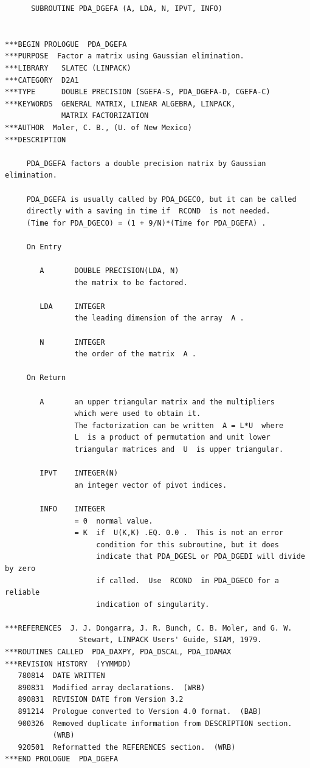 \documentclass[11pt,twoside]{article}
\begin{document}
\begin{verbatim}
      SUBROUTINE PDA_DGEFA (A, LDA, N, IPVT, INFO)


***BEGIN PROLOGUE  PDA_DGEFA
***PURPOSE  Factor a matrix using Gaussian elimination.
***LIBRARY   SLATEC (LINPACK)
***CATEGORY  D2A1
***TYPE      DOUBLE PRECISION (SGEFA-S, PDA_DGEFA-D, CGEFA-C)
***KEYWORDS  GENERAL MATRIX, LINEAR ALGEBRA, LINPACK,
             MATRIX FACTORIZATION
***AUTHOR  Moler, C. B., (U. of New Mexico)
***DESCRIPTION

     PDA_DGEFA factors a double precision matrix by Gaussian elimination.

     PDA_DGEFA is usually called by PDA_DGECO, but it can be called
     directly with a saving in time if  RCOND  is not needed.
     (Time for PDA_DGECO) = (1 + 9/N)*(Time for PDA_DGEFA) .

     On Entry

        A       DOUBLE PRECISION(LDA, N)
                the matrix to be factored.

        LDA     INTEGER
                the leading dimension of the array  A .

        N       INTEGER
                the order of the matrix  A .

     On Return

        A       an upper triangular matrix and the multipliers
                which were used to obtain it.
                The factorization can be written  A = L*U  where
                L  is a product of permutation and unit lower
                triangular matrices and  U  is upper triangular.

        IPVT    INTEGER(N)
                an integer vector of pivot indices.

        INFO    INTEGER
                = 0  normal value.
                = K  if  U(K,K) .EQ. 0.0 .  This is not an error
                     condition for this subroutine, but it does
                     indicate that PDA_DGESL or PDA_DGEDI will divide by zero
                     if called.  Use  RCOND  in PDA_DGECO for a reliable
                     indication of singularity.

***REFERENCES  J. J. Dongarra, J. R. Bunch, C. B. Moler, and G. W.
                 Stewart, LINPACK Users' Guide, SIAM, 1979.
***ROUTINES CALLED  PDA_DAXPY, PDA_DSCAL, PDA_IDAMAX
***REVISION HISTORY  (YYMMDD)
   780814  DATE WRITTEN
   890831  Modified array declarations.  (WRB)
   890831  REVISION DATE from Version 3.2
   891214  Prologue converted to Version 4.0 format.  (BAB)
   900326  Removed duplicate information from DESCRIPTION section.
           (WRB)
   920501  Reformatted the REFERENCES section.  (WRB)
***END PROLOGUE  PDA_DGEFA
\end{verbatim}
\end{document}
